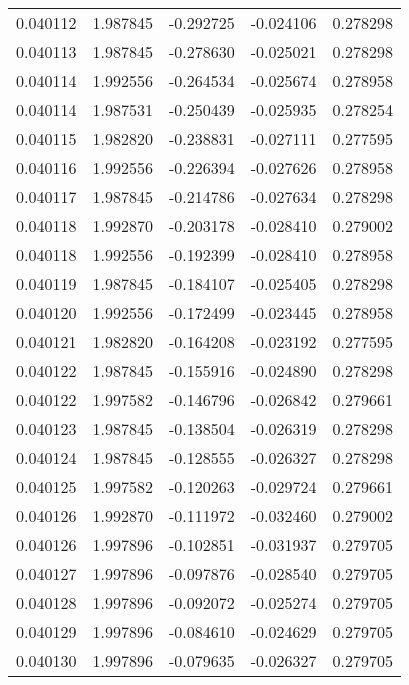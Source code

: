 \begin{tabular}{lrrrr}
0.040112    &  1.987845 & -0.292725 & -0.024106 &             0.278298 \\
0.040113    &  1.987845 & -0.278630 & -0.025021 &             0.278298 \\
0.040114    &  1.992556 & -0.264534 & -0.025674 &             0.278958 \\
0.040114    &  1.987531 & -0.250439 & -0.025935 &             0.278254 \\
0.040115    &  1.982820 & -0.238831 & -0.027111 &             0.277595 \\
0.040116    &  1.992556 & -0.226394 & -0.027626 &             0.278958 \\
0.040117    &  1.987845 & -0.214786 & -0.027634 &             0.278298 \\
0.040118    &  1.992870 & -0.203178 & -0.028410 &             0.279002 \\
0.040118    &  1.992556 & -0.192399 & -0.028410 &             0.278958 \\
0.040119    &  1.987845 & -0.184107 & -0.025405 &             0.278298 \\
0.040120    &  1.992556 & -0.172499 & -0.023445 &             0.278958 \\
0.040121    &  1.982820 & -0.164208 & -0.023192 &             0.277595 \\
0.040122    &  1.987845 & -0.155916 & -0.024890 &             0.278298 \\
0.040122    &  1.997582 & -0.146796 & -0.026842 &             0.279661 \\
0.040123    &  1.987845 & -0.138504 & -0.026319 &             0.278298 \\
0.040124    &  1.987845 & -0.128555 & -0.026327 &             0.278298 \\
0.040125    &  1.997582 & -0.120263 & -0.029724 &             0.279661 \\
0.040126    &  1.992870 & -0.111972 & -0.032460 &             0.279002 \\
0.040126    &  1.997896 & -0.102851 & -0.031937 &             0.279705 \\
0.040127    &  1.997896 & -0.097876 & -0.028540 &             0.279705 \\
0.040128    &  1.997896 & -0.092072 & -0.025274 &             0.279705 \\
0.040129    &  1.997896 & -0.084610 & -0.024629 &             0.279705 \\
0.040130    &  1.997896 & -0.079635 & -0.026327 &             0.279705 \\

\end{tabular}
